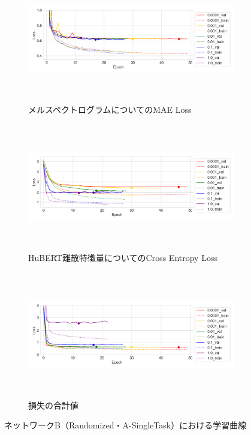\begin{figure}[bt]
    \centering
    \begin{subfigure}{\linewidth}
        \centering
        \includegraphics[height=55mm]{./figure/sec4/learning_curves/9/mel_loss.png}
        \caption{メルスペクトログラムについてのMAE Loss}
        \label{sec4:fig:learning_curve_method_9_val_mel_loss}
    \end{subfigure}
    \begin{subfigure}{\linewidth}
        \centering
        \includegraphics[height=55mm]{./figure/sec4/learning_curves/9/ssl_feature_cluster_loss.png}
        \caption{HuBERT離散特徴量についてのCross Entropy Loss}
        \label{sec4:fig:learning_curve_method_9_val_ssl_feature_cluster_loss}
    \end{subfigure}
    \begin{subfigure}{\linewidth}
        \centering
        \includegraphics[height=55mm]{./figure/sec4/learning_curves/9/total_loss.png}
        \caption{損失の合計値}
        \label{sec4:fig:learning_curve_method_9_val_total_loss}
    \end{subfigure}
    \caption{ネットワークB（Randomized・A-SingleTask）における学習曲線}
    \label{sec4:fig:learning_curve_method_9_val_losses}
\end{figure}

